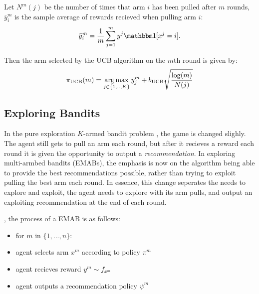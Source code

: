     Let $N^m(j)$ be the number of times that arm $i$ has been pulled after $m$ rounds, $\bar{y}_i^m$ is the sample average of rewards recieved when pulling arm $i$: 
    \begin{align}
        \bar{y}_i^m=\frac{1}{m}\sum_{j=1}^m y^j \one[x^j=i].
    \end{align} 
    
    Then the arm selected by the UCB algorithm on the $m$th round is given by:
    \begin{align}
        \pi_{{\textnormal{UCB}}}(m) = \operatorname*{arg\,max}_{j\in\{1,..,K\}} \bar{y}_j^m + b_{{\textnormal{UCB}}} \sqrt{\frac{\log(m)}{N(j)}} 
    \end{align}






    \subsection{Exploring Bandits}
    \label{sec:2-2-1-exploring-mab}

        In the pure exploration $K$-armed bandit problem ,
        the game is changed slighly. The agent still gets to pull an arm each round, but after it recieves a reward each round it is given the opportunity to output a \textit{recommendation}. In exploring multi-armbed bandits (EMABs), the emphasis is now on the algorithm being able to provide the best recommendations possible, rather than trying to exploit pulling the best arm each round. In essence, this change seperates the needs to explore and exploit, the agent needs to explore with its arm pulls, and output an exploiting recommendation at the end of each round.

        , the process of a EMAB is as follows:
        \begin{itemize}
            \item for $m$ in $\{1,...,n\}$:
            \item agent selects arm $x^m$ according to policy $\pi^m$
            \item agent recieves reward $y^m \sim f_{x^m}$
            \item agent outputs a recommendation policy $\psi^m$
        \end{itemize}

